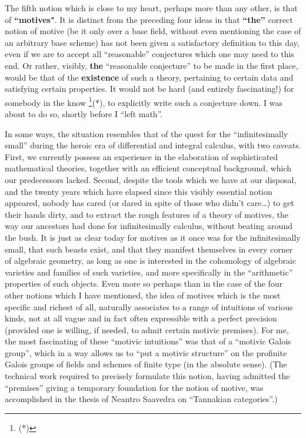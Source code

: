 The fifth notion which is close to my heart, perhaps more than any other, is that of
\textbf{``motives"}.
It is distinct from the preceding four ideas in that
\textbf{``the''} correct notion of motive (be it only over a base field, without even
mentioning the case of an arbitrary base scheme) has not been given a 
satisfactory definition to this day, even if we are to accept all ``reasonable'' conjectures
which one may need to this end. Or rather, visibly, 
\textbf{the} ``reasonable conjecture'' to be made in the first place, would be that of the
\textbf{existence} of such a theory, pertaining to certain data and satisfying certain
properties.
It would not be hard (and entirely fascinating!) for somebody in the
know
\footnote{(*)}(*),
to explicitly write such a conjecture down.
I was about to do so, shortly before I ``left math''.

In some ways, the situation resembles that of the quest for the ``infinitesimally small''
during the heroic era of differential and integral calculus, with two caveats.
First, we currently possess an experience in the elaboration of sophisticated mathematical
theories, together with an efficient conceptual background, which our predecessors lacked. 
Second, despite the tools which we have at our disposal,
and the twenty years which have elapsed since this visibly essential notion appeared,
nobody has cared (or dared in spite of those who didn't care\ldots) to get their hands dirty,
and to extract the rough features of a theory of motives, the way our ancestors had done
for infinitesimally calculus, without beating around the bush.
It is just as clear today for motives as it once was for the infinitesimally small, that
such beasts exist, and that they manifest themselves in every corner of algebraic
geometry, as long as one is interested in the cohomology of algebraic varieties and 
families of such varieties, and more specifically in the ``arithmetic'' properties of
such objects. 
Even more so perhaps than in the case of the four other notions which I have mentioned, the
idea of motives which is the most specific and richest of all, naturally associates to a
range of intuitions of various kinds, not at all vague and in fact often 
expressible with a perfect precision (provided one is willing, if needed, to admit certain motivic
premises). For me, the most fascinating of these ``motivic intuitions'' was that of
a ``motivic Galois group'', which in a way allows us to ``put a motivic structure'' 
on the profinite Galois groups of fields and schemes of finite type (in the absolute
sense).
(The technical work required to precisely formulate this notion, 
having admitted the ``premises'' giving a temporary foundation for the notion of motive,
was accomplished in the thesis of Neantro Saavedra on ``Tannakian categories''.)

